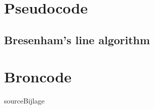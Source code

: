 \documentclass{scrreprt}
\begin{document}
\begin{appendices}
\chapter{Pseudocode}
\label{app:pseudocode}
\section{Bresenham's line algorithm}
\label{appsec:pseudocode-bresenham-line}

\chapter{Broncode}
\label{app:source}
{sourceBijlage}

\end{appendices}
\end{document}

